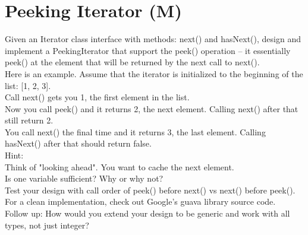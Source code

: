 \section{Peeking Iterator (M)}
Given an Iterator class interface with methods: next() and hasNext(), design and implement a PeekingIterator that support the peek() operation -- it essentially peek() at the element that will be returned by the next call to next().\\

Here is an example. Assume that the iterator is initialized to the beginning of the list: [1, 2, 3].\\
Call next() gets you 1, the first element in the list.\\
Now you call peek() and it returns 2, the next element. Calling next() after that still return 2.\\
You call next() the final time and it returns 3, the last element. Calling hasNext() after that should return false.\\

Hint:\\
    Think of "looking ahead". You want to cache the next element.\\
    Is one variable sufficient? Why or why not?\\
    Test your design with call order of peek() before next() vs next() before peek().\\
    For a clean implementation, check out Google's guava library source code. \\

Follow up: How would you extend your design to be generic and work with all types, not just integer?\\

